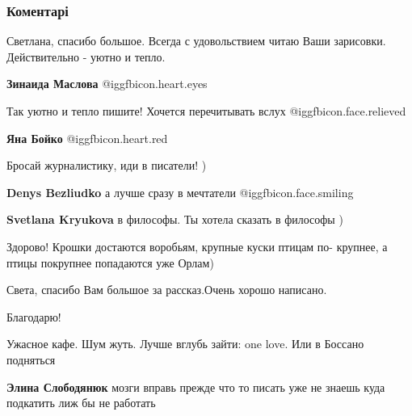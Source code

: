  
 
 
 
 
\subsubsection{Коментарі}
\label{sec:13_09_2021.fb.krjukova_svetlana.1.chelovek_deti_kiev.cmt}

\begin{itemize} %

Светлана, спасибо большое. Всегда с удовольствием читаю Ваши зарисовки. Действительно - уютно и тепло.

\textbf{Зинаида Маслова}  @igg{fbicon.heart.eyes} 

Так уютно и тепло пишите! Хочется перечитывать вслух  @igg{fbicon.face.relieved} 

\textbf{Яна Бойко}  @igg{fbicon.heart.red}

Бросай журналистику, иди в писатели! )

\begin{itemize} %
\textbf{Denys Bezliudko} а лучше сразу в мечтатели 	@igg{fbicon.face.smiling}

\textbf{Svetlana Kryukova} в философы. Ты хотела сказать в философы )
\end{itemize} %

Здорово!
Крошки достаются воробьям, крупные куски птицам по- крупнее, а птицы покрупнее попадаются уже Орлам)

Света, спасибо Вам большое за рассказ.Очень хорошо написано.

Благодарю!

Ужасное кафе. Шум жуть. Лучше вглубь зайти: one love. Или в Боссано подняться

\begin{itemize} %
\textbf{Элина Слободянюк} мозги вправь прежде что то писать уже не знаешь куда подкатить лиж бы не работать
\end{itemize} %


\end{itemize}
